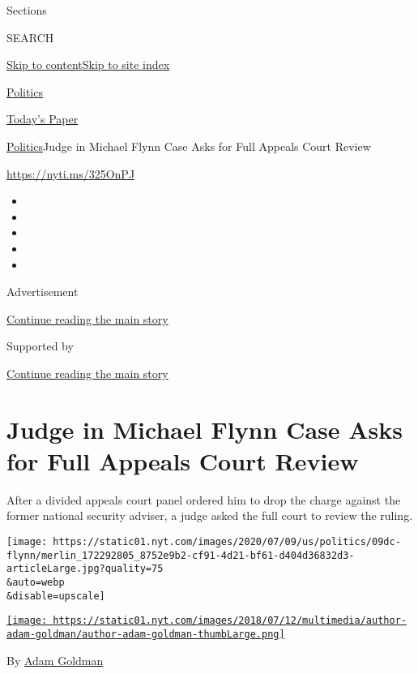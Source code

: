 Sections

SEARCH

\protect\hyperlink{site-content}{Skip to
content}\protect\hyperlink{site-index}{Skip to site index}

\href{https://www.nytimes.com/section/politics}{Politics}

\href{https://myaccount.nytimes.com/auth/login?response_type=cookie\&client_id=vi}{}

\href{https://www.nytimes.com/section/todayspaper}{Today's Paper}

\href{/section/politics}{Politics}\textbar{}Judge in Michael Flynn Case
Asks for Full Appeals Court Review

\url{https://nyti.ms/325OnPJ}

\begin{itemize}
\item
\item
\item
\item
\item
\end{itemize}

Advertisement

\protect\hyperlink{after-top}{Continue reading the main story}

Supported by

\protect\hyperlink{after-sponsor}{Continue reading the main story}

\hypertarget{judge-in-michael-flynn-case-asks-for-full-appeals-court-review}{%
\section{Judge in Michael Flynn Case Asks for Full Appeals Court
Review}\label{judge-in-michael-flynn-case-asks-for-full-appeals-court-review}}

After a divided appeals court panel ordered him to drop the charge
against the former national security adviser, a judge asked the full
court to review the ruling.

\texttt{[image: https://static01.nyt.com/images/2020/07/09/us/politics/09dc-flynn/merlin\_172292805\_8752e9b2-cf91-4d21-bf61-d404d36832d3-articleLarge.jpg?quality=75\\\&auto=webp\\\&disable=upscale]}

\href{https://www.nytimes.com/by/adam-goldman}{\texttt{[image: https://static01.nyt.com/images/2018/07/12/multimedia/author-adam-goldman/author-adam-goldman-thumbLarge.png]}}

By \href{https://www.nytimes.com/by/adam-goldman}{Adam Goldman}

